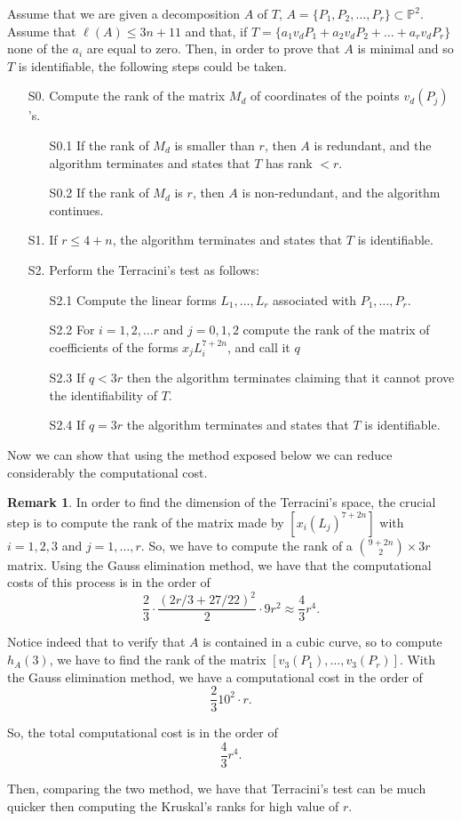 \documentclass[a4paper,10pt,oneside]{article}
\theoremstyle{casep}
\newcommand{\Pj}{\mathbb{P}}
\theoremstyle{definition}
\newtheorem{remark}[theorem]{Remark}
\begin{document}
Assume that we are given a decomposition $A$ of $T$, $A= \{P_1, P_2, \dots , P_r \} \subset \Pj^2.$ Assume that $\ell(A)\leq 3n+11$ and
that, if $T= \{ a_1v_d{P_1}+a_2v_d{P_2}+\dots +a_rv_d{P_r} \}$ none of the $ a_i $ are equal to zero.
Then, in order to prove that $A$ is minimal and so $T$ is identifiable, the following steps could be taken.
\begin{itemize}
\item[S0.] Compute the rank of the matrix $M_d$ of coordinates of the points $v_d(P_j)$'s.
\begin{itemize}
\item[S0.1] If the rank of $M_d$ is smaller than $r$, then $A$ is redundant, and the algorithm 
terminates and states that $T$ has rank $<r$. 
\item[S0.2] If the rank of $M_d$ is $r$, then $A$ is non-redundant, and the algorithm continues.
\end{itemize}
\item[S1.] If $r \leq 4 +n$, the algorithm terminates and states that $T$ is identifiable.
\item[S2.] Perform the Terracini's test as follows:
\begin{itemize}
\item[S2.1] Compute the linear forms $L_1, \dots ,L_r$ associated with $P_1,\dots , P_r$.
\item[S2.2] For $i=1,2, \dots r$ and $j=0,1,2$ compute the rank of the matrix of coefficients of the forms $x_j L_i^{7+2n} $, and call it $q$
\item[S2.3] If $q < 3r$ then the algorithm terminates claiming that it cannot prove the identifiability of $T$. 
\item[S2.4] If $q = 3r$ the algorithm terminates and states that $T$ is identifiable. 
\end{itemize}

\end{itemize}


Now we can show that using the method exposed below we can reduce considerably the computational cost.

\begin{remark} \label{compucost}
In order to find the dimension of the Terracini's space, the crucial step is
 to compute the rank of the matrix made by $[x_i (L_j)^{7+2n}]$ with $i=1,2,3$ and $j=1, \dots, r$. 
 So, we have to compute the rank of a $ \binom{9+2n}{2} \times 3r$ matrix. 
 Using the Gauss elimination method, we have that the computational costs of this process is in the order of 
 $$\frac{2}{3} \cdot \frac{(2r/3+27/22)^2}{2} \cdot 9r^2 \approx \frac{4}{3}r^4.$$

Notice indeed that to verify that $A$ is contained in a cubic curve, so to compute $h_A(3)$, we have to find the rank 
of the matrix $[v_3(P_1), \dots , v_3(P_r)]$. With the Gauss elimination method,
we have a computational cost in the order of $$ \frac{2}{3} 10^2 \cdot r. $$

So, the total computational cost is in the order of $$\frac{4}{3}r^4.$$

Then, comparing the two method, we have that Terracini's test can be much quicker then computing the Kruskal's ranks for high value of $r$.
\end{remark}
\end{document}
